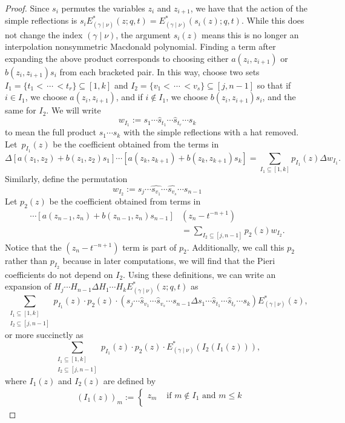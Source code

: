 \documentclass[ALCO]{cedram}
\newcommand{\shatproduct}{s_1 \dotsm \widehat{s}_{t_1} \dotsm \widehat{s}_{t_r} \dotsm s_k}
\newcommand{\Estar}[1]{E^*_{#1}}
\newcommand{\Estarlong}[1]{E^*_{#1}(z;q,t)}
\newcommand{\gammanu}{{(\gamma \mid \nu)}}
\begin{document}
\begin{proof}
Since $s_i$ permutes the variables $z_i$ and $z_{i+1}$, we have that the action of the simple reflections is $s_i\Estarlong{\gammanu} = \Estar{\gammanu}(s_i(z);q,t)$. While this does not change the index $\gammanu$, the argument $s_i(z)$ means this is no longer an interpolation nonsymmetric Macdonald polynomial. Finding a term after expanding the above product corresponds to choosing either $a(z_i,z_{i+1})$ or $b(z_i,z_{i+1}) s_i$ from each bracketed pair. In this way, choose two sets $I_1=\{t_1< \, \dotsm \, < t_r\} \subseteq [1,k]$ and $I_2=\{v_1< \, \dotsm \, < v_s\} \subseteq [j,n-1]$ so that if $i\in I_1$, we choose $a(z_i,z_{i+1})$, and if $i\notin I_1$, we choose $b(z_i,z_{i+1})s_i$, and the same for $I_2$. We will write
\[ w_{I_1} := \shatproduct \]
to mean the full product $s_1 \dotsm s_k$ with the simple reflections with a hat removed. Let~$p_{I_1}(z)$ be the coefficient obtained from the terms in
\[ \Delta [a(z_1, z_2)+b(z_1,z_2) s_1] \dotsm [a(z_k,z_{k+1}) + b(z_k,z_{k+1})s_k] = \sum_{I_1\subseteq [1,k]} p_{I_1}(z) \Delta w_{I_1}.\]
Similarly, define the permutation
\[w_{I_2} := s_j \dotsm \widehat{s_{v_1}} \dotsm \widehat{s_{v_s}} \dotsm s_{n-1} \]
Let $p_{2}(z)$  be the coefficient obtained from terms in
\begin{align*} [a(z_j,z_{j+1})+b(z_j,z_{j+1}) s_j] \dotsm [a(z_{n-1},z_n)+b(z_{n-1},z_n) s_{n-1}] &(z_n-t^{-n+1})\\ &=\sum_{I_2\subseteq[j,n-1]}p_2(z)w_{I_2}.\end{align*}
Notice that the $(z_n-t^{-n+1})$ term is part of $p_2$. Additionally, we call this $p_2$ rather than $p_{I_2}$ because in later computations, we will find that the Pieri coefficients do not depend on $I_2$. Using these definitions, we can write an expansion of $\displaystyle{H_j \dotsm H_{n-1} \Delta H_1 \dotsm H_k  \Estarlong{\gammanu}}$ as
\begin{equation}\label{Expandedright}
      \sum\limits_{\substack{I_1 \subseteq [1,k] \\ I_2 \subseteq [j, n-1]}} p_{I_1}(z) \cdot p_2(z)  \cdot \left( s_j \dotsm \widehat{s}_{v_1} \dotsm \widehat{s}_{v_s} \dotsm s_{n-1}\Delta \shatproduct \right) \Estar{\gammanu}(z), \end{equation}
or more succinctly as
   \[ \sum\limits_{\substack{I_1 \subseteq [1,k] \\ I_2 \subseteq [j, n-1]}} p_{I_1}(z) \cdot p_2(z)  \cdot \Estar{\gammanu}(I_2(I_1(z))),
\]
where $I_1(z)$ and $I_2(z)$ are defined by
\begin{align} \label{Ione}&(I_1(z))_m := \begin{cases} z_m  &\text{ if } m\notin I_1 \text{ and } m \leq k \\

\end{cases}
\end{align}
\end{proof}
\end{document}
